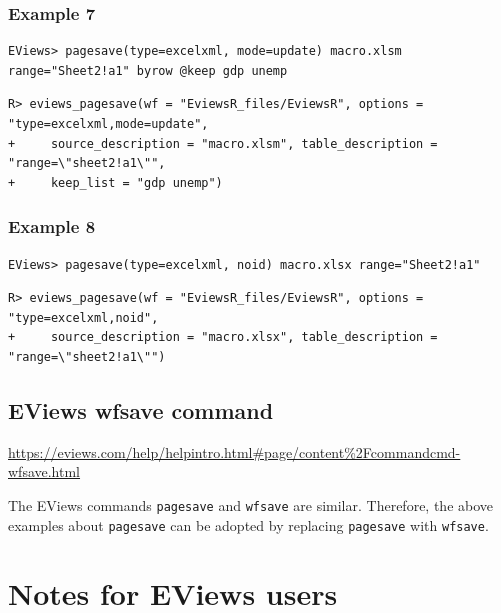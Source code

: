 \hypertarget{example-7-3}{%
\subsubsection{Example 7}\label{example-7-3}}

\begin{verbatim}
EViews> pagesave(type=excelxml, mode=update) macro.xlsm range="Sheet2!a1" byrow @keep gdp unemp
\end{verbatim}

\begin{verbatim}
R> eviews_pagesave(wf = "EviewsR_files/EviewsR", options = "type=excelxml,mode=update",
+     source_description = "macro.xlsm", table_description = "range=\"sheet2!a1\"",
+     keep_list = "gdp unemp")
\end{verbatim}

\hypertarget{example-8-3}{%
\subsubsection{Example 8}\label{example-8-3}}

\begin{verbatim}
EViews> pagesave(type=excelxml, noid) macro.xlsx range="Sheet2!a1"
\end{verbatim}

\begin{verbatim}
R> eviews_pagesave(wf = "EviewsR_files/EviewsR", options = "type=excelxml,noid",
+     source_description = "macro.xlsx", table_description = "range=\"sheet2!a1\"")
\end{verbatim}

\hypertarget{eviews-wfsave-command}{%
\subsection{EViews wfsave command}\label{eviews-wfsave-command}}

\url{https://eviews.com/help/helpintro.html\#page/content\%2Fcommandcmd-wfsave.html}

The EViews commands \texttt{pagesave} and \texttt{wfsave} are similar. Therefore, the above examples about \texttt{pagesave} can be adopted by replacing \texttt{pagesave} with \texttt{wfsave}.

\hypertarget{notes-for-eviews-users}{%
\section{Notes for EViews users}\label{notes-for-eviews-users}}

